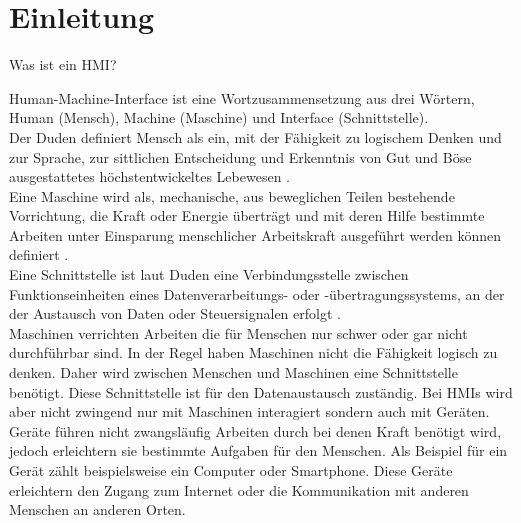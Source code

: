 \section{Einleitung}\label{einleitung}

% 






Was ist ein \acf{HMI}? 

Human-Machine-Interface ist eine Wortzusammensetzung aus drei Wörtern, Human (Mensch), Machine (Maschine) und Interface (Schnittstelle).\\

Der Duden definiert Mensch als ein, \glqq mit der Fähigkeit zu logischem Denken und zur Sprache, zur sittlichen Entscheidung und Erkenntnis von Gut und Böse ausgestattetes höchstentwickeltes Lebewesen\grqq{} \cite{duden_mensch}.\\

Eine Maschine wird als, \glqq mechanische, aus beweglichen Teilen bestehende Vorrichtung, die Kraft oder Energie überträgt und mit deren Hilfe bestimmte Arbeiten unter Einsparung menschlicher Arbeitskraft ausgeführt werden können\grqq{} definiert \cite{duden_maschine}.\\

Eine Schnittstelle ist laut Duden eine \glqq Verbindungsstelle zwischen Funktionseinheiten eines Datenverarbeitungs- oder -übertragungssystems, an der der Austausch von Daten oder Steuersignalen erfolgt \grqq{} \cite{duden_schnittstelle}.\\

Maschinen verrichten Arbeiten die für Menschen nur schwer oder gar nicht durchführbar sind. In der Regel haben Maschinen nicht die Fähigkeit logisch zu denken. Daher wird zwischen Menschen und Maschinen eine Schnittstelle benötigt. Diese Schnittstelle ist für den Datenaustausch zuständig. Bei \acp{HMI} wird aber nicht zwingend nur mit Maschinen interagiert sondern auch mit Geräten. Geräte führen nicht zwangsläufig Arbeiten durch bei denen Kraft benötigt wird, jedoch erleichtern sie bestimmte Aufgaben für den Menschen. Als Beispiel für ein Gerät zählt beispielsweise ein Computer oder Smartphone. Diese Geräte erleichtern den Zugang zum Internet oder die Kommunikation mit anderen Menschen an anderen Orten.\\


